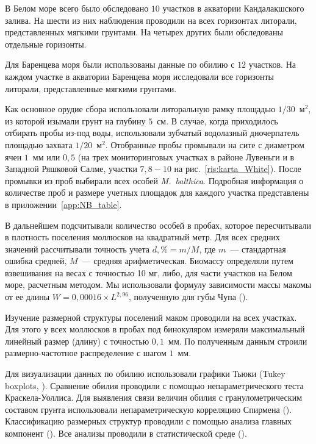 В Белом море всего было обследовано $10$ участков в акватории Кандалакшского залива. 
На шести из них наблюдения проводили на всех горизонтах литорали, представленных мягкими грунтами.
На четырех других были обследованы отдельные горизонты. 

Для Баренцева моря были использованы данные по обилию с $12$ участков. 
На каждом участке в акватории Баренцева моря исследовали все  горизонты литорали, представленные мягкими грунтами.  

Как основное орудие сбора использовали литоральную рамку площадью $1/30$~м$^2$, из которой изымали грунт на глубину $5$~см. 
В случае, когда приходилось отбирать пробы из-под воды, использовали зубчатый водолазный дночерпатель площадью захвата $1/20$~м$^2$.
Отобранные пробы промывали на сите с диаметром ячеи $1$~мм или $0,5$ (на трех мониторинговых участках в районе Лувеньги и в Западной Ряшковой Салме, участки $7, 8 - 10$ на рис.~\ref{ris:karta_White}). 
После промывки из   проб   выбирали   всех   особей  {\it M.~balthica}.
Подробная информация о количестве проб и размере учетных площадок для каждого участка представлены в приложении~\ref{app:NB_table}.

В дальнейшем подсчитывали количество особей в пробах, которое пересчитывали в плотность поселения моллюсков на квадратный метр. 
Для всех средних значений рассчитывали точность учета $d,\% = m/M$, где $m$~--- стандартная ошибка средней, $M$~--- средняя арифметическая.
Биомассу определяли путем взвешивания на весах с точностью 10 мг, либо, для части участков на Белом море, расчетным методом.
Мы использовали формулу зависимости массы макомы от ее длины $W = 0,00016 \times L^{2,96}$, полученную для губы Чупа (\cite{Maximovich_et_al_1993}).


Изучение размерной структуры поселений маком проводили на всех участках.
Для этого у всех моллюсков в пробах под бинокуляром измеряли максимальный линейный размер (длину) с точностью $0,1$~мм.
По полученным данным строили размерно-частотное распределение с шагом $1$~мм.


Для визуализации данных по обилию использовали графики Тьюки (Tukey boxplots, \cite{Tukey_1977}). 
Сравнение обилия проводили с помощью непараметрического теста Краскела-Уоллиса. 
Для выявления связи величин обилия с гранулометрическим составом грунта использовали непараметрическую корреляцию Спирмена (\cite{Hollander_et_al_2013}).
Классификацию размерных структур проводили с помощью анализа главных компонент (\cite{Mardia_et_al_1979}).
Все анализы проводили в статистической среде \R{} (\cite{R_2014}).

